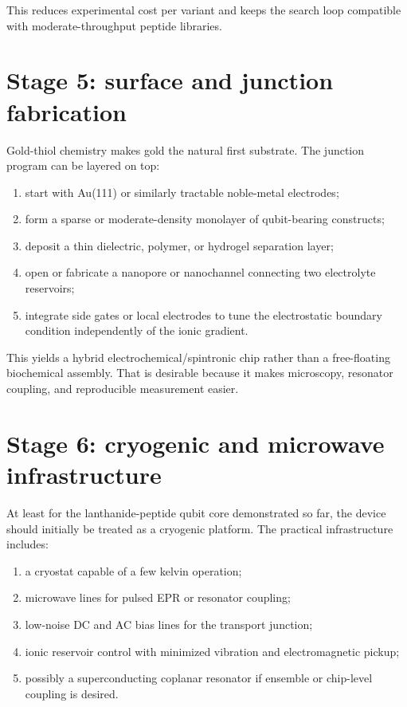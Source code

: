 \documentclass[11pt]{report}
\newcommand{\au}{Au(111)}
\theoremstyle{definition}
\begin{document}
This reduces experimental cost per variant and keeps the search loop compatible with moderate-throughput peptide libraries.

\section{Stage 5: surface and junction fabrication}
Gold-thiol chemistry makes gold the natural first substrate. The junction program can be layered on top:

\begin{enumerate}[leftmargin=2em]
\item start with \au{} or similarly tractable noble-metal electrodes;
\item form a sparse or moderate-density monolayer of qubit-bearing constructs;
\item deposit a thin dielectric, polymer, or hydrogel separation layer;
\item open or fabricate a nanopore or nanochannel connecting two electrolyte reservoirs;
\item integrate side gates or local electrodes to tune the electrostatic boundary condition independently of the ionic gradient.
\end{enumerate}

This yields a hybrid electrochemical/spintronic chip rather than a free-floating biochemical assembly. That is desirable because it makes microscopy, resonator coupling, and reproducible measurement easier.

\section{Stage 6: cryogenic and microwave infrastructure}
At least for the lanthanide-peptide qubit core demonstrated so far, the device should initially be treated as a cryogenic platform. The practical infrastructure includes:

\begin{enumerate}[leftmargin=2em]
\item a cryostat capable of a few kelvin operation;
\item microwave lines for pulsed EPR or resonator coupling;
\item low-noise DC and AC bias lines for the transport junction;
\item ionic reservoir control with minimized vibration and electromagnetic pickup;
\item possibly a superconducting coplanar resonator if ensemble or chip-level coupling is desired.
\end{enumerate}
\end{document}
